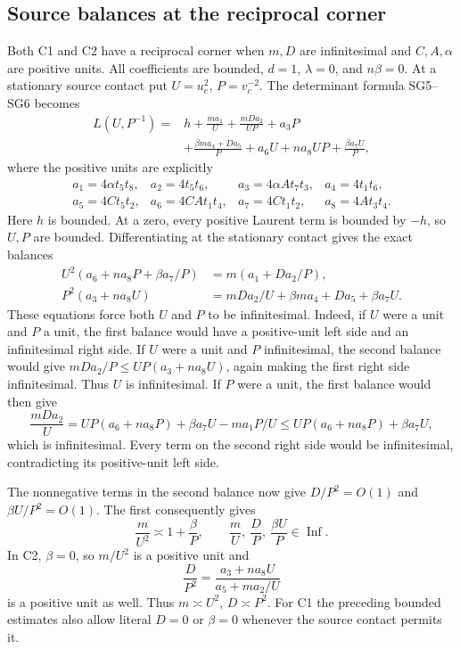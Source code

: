 \subsection*{Source balances at the reciprocal corner}
\label{lem:reciprocal-source-balance}
Both C1 and C2 have a reciprocal corner when $m,D$ are
infinitesimal and $C,A,\alpha$ are positive units. All coefficients
are bounded, $d=1$, $\lambda=0$, and $n\beta=0$.
At a stationary source contact put $U=u_c^2$, $P=v_c^{-2}$.
The determinant formula SG5--SG6 becomes
\[
\begin{split}
 L(U,P^{-1})={}&h+\frac{ma_1}{U}+\frac{mDa_2}{UP}+a_3P\\
 &+\frac{\beta ma_4+Da_5}{P}+a_6U+na_8UP
 +\frac{\beta a_7U}{P},
\end{split}
\]
where the positive units are explicitly
\[
\begin{array}{llll}
a_1=4\alpha t_5t_8,&a_2=4t_5t_6,&a_3=4\alpha A t_7t_3,&a_4=4t_1t_6,\\
a_5=4Ct_5t_2,&a_6=4CAt_1t_4,&a_7=4Ct_1t_2,&a_8=4At_3t_4.
\end{array}
\]
Here $h$ is bounded. At a zero, every positive Laurent term is
bounded by $-h$, so $U,P$ are bounded. Differentiating at the
stationary contact gives the exact balances
\begin{equation}
\begin{aligned}
 U^2(a_6+na_8P+\beta a_7/P)&=m(a_1+Da_2/P),\\
 P^2(a_3+na_8U)&=mDa_2/U+\beta ma_4+Da_5+\beta a_7U.
\end{aligned}
\label{eq:reciprocal-source-balances}
\end{equation}
These equations force both $U$ and $P$ to be infinitesimal.
Indeed, if $U$ were a unit and $P$ a unit, the first balance
would have a positive-unit left side and an infinitesimal right
side. If $U$ were a unit and $P$ infinitesimal, the second balance
would give $mDa_2/P\le UP(a_3+na_8U)$, again making the first
right side infinitesimal. Thus $U$ is infinitesimal. If $P$ were
a unit, the first balance would then give
\[
 \frac{mDa_2}{U}
 =UP(a_6+na_8P)+\beta a_7U-ma_1P/U
 \le UP(a_6+na_8P)+\beta a_7U,
\]
which is infinitesimal. Every term on the second right side would
be infinitesimal, contradicting its positive-unit left side.

The nonnegative terms in the second balance now give
$D/P^2=O(1)$ and $\beta U/P^2=O(1)$. The first consequently gives
\begin{equation}
 \frac m{U^2}\asymp1+\frac\beta P,\qquad
 \frac mU,\ \frac DP,\ \frac{\beta U}P\in\operatorname{Inf}.
\label{eq:reciprocal-source-ratios}
\end{equation}
In C2, $\beta=0$, so $m/U^2$ is a positive unit and
\[
 \frac D{P^2}=\frac{a_3+na_8U}{a_5+ma_2/U}
\]
is a positive unit as well. Thus $m\asymp U^2$, $D\asymp P^2$.
For C1 the preceding bounded estimates also allow literal $D=0$
or $\beta=0$ whenever the source contact permits it.


